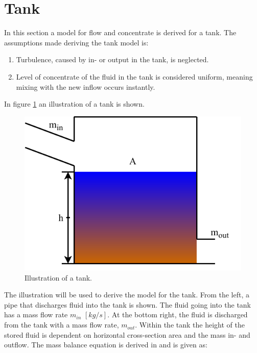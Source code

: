 \section{Tank}\label{se:sewer_reservoir}
In this section a model for flow and concentrate is derived for a tank.%
 The assumptions made deriving the tank model is:
\begin{table}[H]
\begin{enumerate}
\item Turbulence, caused by in- or output in the tank, is neglected.
\item Level of concentrate of the fluid in the tank is considered uniform, meaning mixing with the new inflow occurs instantly. 
\end{enumerate}
\end{table}

In figure \ref{fig:tank_model} an illustration of a tank is shown.
\begin{figure}[H]
\centering
\includegraphics[width=.55\textwidth]{report/modeling/pictures/reservior.pdf}
\caption{Illustration of a tank.}
\label{fig:tank_model}
\end{figure} 

The illustration will be used to derive the model for the tank. From the left, a pipe that discharges fluid into the tank is shown. The fluid going into the tank has a mass flow rate $m_{in}$ $\left[kg/s\right]$. At the bottom right, the fluid is discharged from the tank with a mass flow rate, $m_{out}$. 
Within the tank the height of the stored fluid is dependent on horizontal cross-section area and the mass in- and outflow.
The mass balance equation is derived in \cite{model_tank} and is given as:



